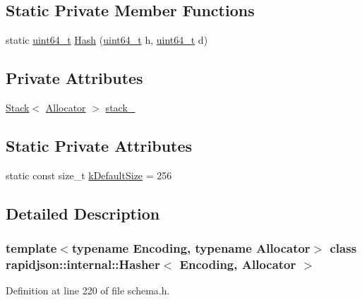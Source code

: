 \subsection*{Static Private Member Functions}
\begin{DoxyCompactItemize}
\item 
static \mbox{\hyperlink{stdint_8h_aec6fcb673ff035718c238c8c9d544c47}{uint64\+\_\+t}} \mbox{\hyperlink{classrapidjson_1_1internal_1_1_hasher_a421b790304658122bcb7c9f29dba6a34}{Hash}} (\mbox{\hyperlink{stdint_8h_aec6fcb673ff035718c238c8c9d544c47}{uint64\+\_\+t}} h, \mbox{\hyperlink{stdint_8h_aec6fcb673ff035718c238c8c9d544c47}{uint64\+\_\+t}} d)
\end{DoxyCompactItemize}
\subsection*{Private Attributes}
\begin{DoxyCompactItemize}
\item 
\mbox{\hyperlink{classrapidjson_1_1internal_1_1_stack}{Stack}}$<$ \mbox{\hyperlink{classrapidjson_1_1_allocator}{Allocator}} $>$ \mbox{\hyperlink{classrapidjson_1_1internal_1_1_hasher_ab1523886f80d5f979813f02ca3d39c29}{stack\+\_\+}}
\end{DoxyCompactItemize}
\subsection*{Static Private Attributes}
\begin{DoxyCompactItemize}
\item 
static const size\+\_\+t \mbox{\hyperlink{classrapidjson_1_1internal_1_1_hasher_aeb47a8003b45accc29ad48ecf137965a}{k\+Default\+Size}} = 256
\end{DoxyCompactItemize}


\subsection{Detailed Description}
\subsubsection*{template$<$typename Encoding, typename Allocator$>$\newline
class rapidjson\+::internal\+::\+Hasher$<$ Encoding, Allocator $>$}



Definition at line 220 of file schema.\+h.



